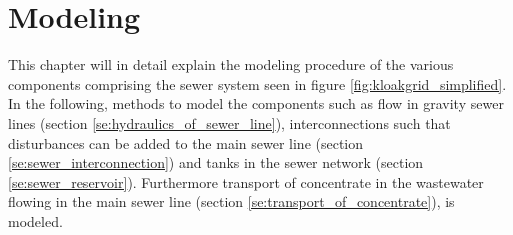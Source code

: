 \chapter{Modeling}\label{se:modeling}

This chapter will in detail explain the modeling procedure of the various components comprising the sewer system seen in figure \ref{fig:kloakgrid_simplified}.
In the following, methods to model the components such as flow in gravity sewer lines (section \ref{se:hydraulics_of_sewer_line}), interconnections such that disturbances can be added to the main sewer line (section \ref{se:sewer_interconnection}) and tanks in the sewer network (section \ref{se:sewer_reservoir}). Furthermore transport of concentrate in the wastewater flowing in the main sewer line (section \ref{se:transport_of_concentrate}), is modeled.






